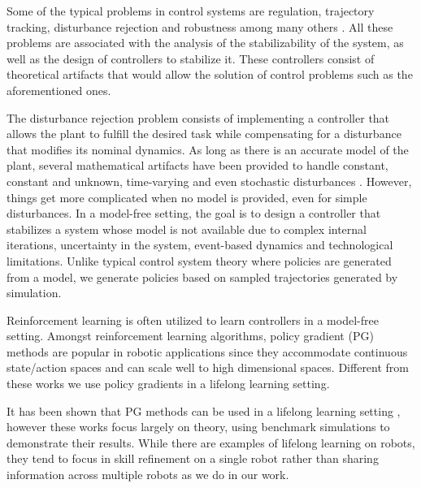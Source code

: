 \documentclass{aamas2016}
\begin{document}
Some of the typical problems in control systems are regulation, trajectory tracking, disturbance rejection and
robustness among many others \cite{Khalil-2002, Lewis-2012,Nise-2010}. All these problems are associated with the analysis of the stabilizability of the system, 
as well as the design of controllers to stabilize it. These controllers consist of theoretical artifacts that would allow 
the solution of control problems such as the aforementioned ones. 

The disturbance rejection problem consists of implementing a controller that allows the plant to fulfill the desired task while compensating
for a disturbance that modifies its nominal dynamics. As long as there is an accurate model of the plant, several mathematical
artifacts have been provided to handle constant, constant and unknown, time-varying and even stochastic disturbances 
\cite{Dorato-2000,Khalil-2002,Lewis-2012}. 
However, things get more complicated when no model is provided, even for simple disturbances. In a model-free setting, the goal is to design a 
controller that stabilizes a system whose model is not available due to complex internal iterations, uncertainty in the system, event-based
dynamics and technological limitations. Unlike typical control system theory where policies are generated from a model, we generate policies based on sampled trajectories generated by simulation.

Reinforcement learning \cite{kober2013reinforcement} is often utilized to learn controllers in a model-free setting. Amongst reinforcement learning algorithms, policy gradient (PG) methods \cite{sutton1999policy,williams1992simple} are popular in robotic applications \cite{kober2009policy,peters2008natural} since they accommodate continuous state/action spaces and can scale well to high dimensional spaces. Different from these works we use policy gradients in a lifelong learning setting.


It has been shown that PG methods can be used in a lifelong learning setting \cite{BouAmmar2014a,bouAmmar2015unsupervised}, however these works focus largely on theory, using benchmark simulations to demonstrate their results. While there are examples of lifelong learning on robots, they tend to focus in skill refinement on a single robot \cite{kleiner2002towards,thrun1995lifelong} rather than sharing information across multiple robots as we do in our work. 
\end{document}
